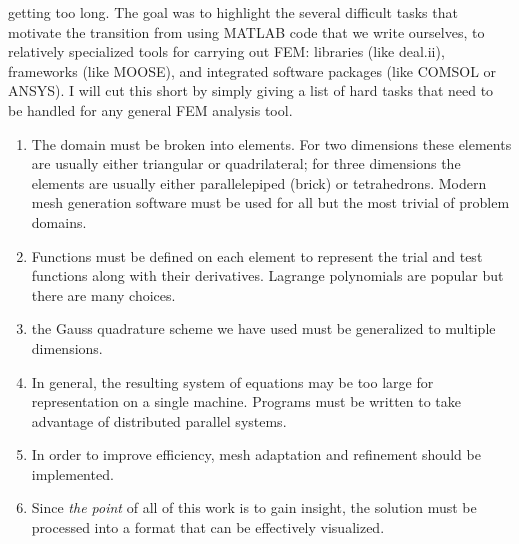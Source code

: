  getting too long.  The goal was to highlight the several difficult tasks that motivate the transition from using MATLAB code that we write ourselves, to relatively specialized tools for carrying out FEM: libraries (like deal.ii), frameworks (like MOOSE), and integrated software packages (like COMSOL or ANSYS).  I will cut this short by simply giving a list of hard tasks that need to be handled for any general FEM analysis tool.
\begin{enumerate}
\item The domain must be broken into elements.  For two dimensions these elements are usually either triangular or quadrilateral; for three dimensions the elements are usually either parallelepiped (brick) or tetrahedrons.  Modern mesh generation software must be used for all but the most trivial of problem domains.
\item Functions must be defined on each element to represent the trial and test functions along with their derivatives. Lagrange polynomials are popular but there are many choices.  
\item the Gauss quadrature scheme we have used must be generalized to multiple dimensions. 
\item In general, the resulting system of equations may be too large for representation on a single machine.  Programs must be written to take advantage of distributed parallel systems. 
\item In order to improve efficiency, mesh adaptation and refinement should be implemented.  
\item Since \emph{the point} of all of this work is to gain insight, the solution must be processed into a format that can be effectively visualized.
\end{enumerate}



